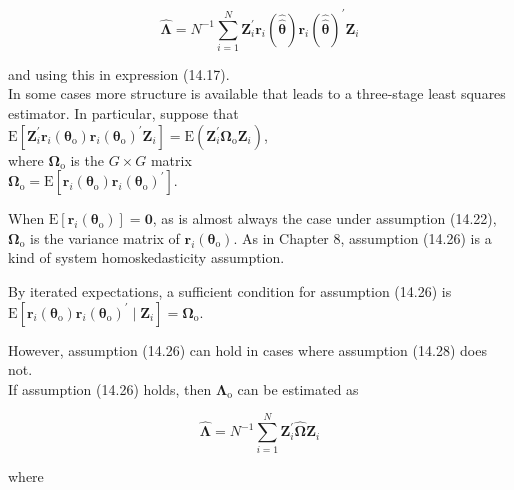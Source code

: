 \documentclass[10pt]{article}
\begin{document}
\begin{equation*}
\hat{\boldsymbol{\Lambda}}=N^{-1} \sum_{i=1}^{N} \mathbf{Z}_{i}^{\prime} \mathbf{r}_{i}(\hat{\hat{\boldsymbol{\theta}}}) \mathbf{r}_{i}(\hat{\hat{\boldsymbol{\theta}}})^{\prime} \mathbf{Z}_{i} \tag{14.25}
\end{equation*}


and using this in expression (14.17).\\
In some cases more structure is available that leads to a three-stage least squares estimator. In particular, suppose that\\
$\mathrm{E}\left[\mathbf{Z}_{i}^{\prime} \mathbf{r}_{i}\left(\boldsymbol{\theta}_{\mathrm{o}}\right) \mathbf{r}_{i}\left(\boldsymbol{\theta}_{\mathrm{o}}\right)^{\prime} \mathbf{Z}_{i}\right]=\mathrm{E}\left(\mathbf{Z}_{i}^{\prime} \boldsymbol{\Omega}_{\mathrm{o}} \mathbf{Z}_{i}\right)$,\\
where $\boldsymbol{\Omega}_{\mathrm{o}}$ is the $G \times G$ matrix\\
$\boldsymbol{\Omega}_{\mathrm{o}}=\mathrm{E}\left[\mathbf{r}_{i}\left(\boldsymbol{\theta}_{\mathrm{o}}\right) \mathbf{r}_{i}\left(\boldsymbol{\theta}_{\mathrm{o}}\right)^{\prime}\right]$.

When $\mathrm{E}\left[\mathbf{r}_{i}\left(\boldsymbol{\theta}_{\mathrm{o}}\right)\right]=\mathbf{0}$, as is almost always the case under assumption (14.22), $\boldsymbol{\Omega}_{\mathrm{o}}$ is the variance matrix of $\mathbf{r}_{i}\left(\boldsymbol{\theta}_{\mathrm{o}}\right)$. As in Chapter 8, assumption (14.26) is a kind of system homoskedasticity assumption.

By iterated expectations, a sufficient condition for assumption (14.26) is\\
$\mathrm{E}\left[\mathbf{r}_{i}\left(\boldsymbol{\theta}_{\mathrm{o}}\right) \mathbf{r}_{i}\left(\boldsymbol{\theta}_{\mathrm{o}}\right)^{\prime} \mid \mathbf{Z}_{i}\right]=\boldsymbol{\Omega}_{\mathrm{o}}$.

However, assumption (14.26) can hold in cases where assumption (14.28) does not.\\
If assumption (14.26) holds, then $\boldsymbol{\Lambda}_{\mathrm{o}}$ can be estimated as


\begin{equation*}
\hat{\boldsymbol{\Lambda}}=N^{-1} \sum_{i=1}^{N} \mathbf{Z}_{i}^{\prime} \hat{\boldsymbol{\Omega}} \mathbf{Z}_{i} \tag{14.29}
\end{equation*}


where
\end{document}
